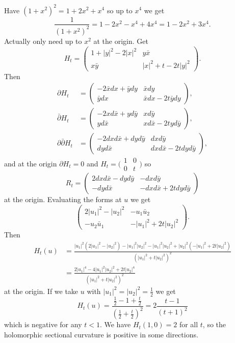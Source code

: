 \documentclass[10pt,a4paper]{amsart}
\def\p{\partial}
\def\bp{\bar\partial}
\def\hsc{holomorphic sectional curvature}
\begin{document}
Have $(1+x^2)^2 = 1 + 2x^2 + x^4$ so up to $x^4$ we get
$$
\frac{1}{(1+x^2)^2} = 1 - 2x^2 - x^4 + 4x^4 = 1 - 2x^2 + 3x^4.
$$
Actually only need up to $x^2$ at the origin.
Get
$$
H_t
=
\begin{pmatrix}
1 + |y|^2 - 2|x|^2 &
y \bar x
\\
x \bar y &
|x|^2 + t - 2t|y|^2
\end{pmatrix}.
$$
Then
\begin{align*}
\partial H_t
& =
\begin{pmatrix}
-2 \bar x dx + \bar y dy &
\bar x dy
\\
\bar y dx &
\bar x dx - 2t \bar y dy
\end{pmatrix},
\\
\bp H_t
& =
\begin{pmatrix}
-2 x d\bar x + y d\bar y &
x d\bar y
\\
y d\bar x &
x d\bar x - 2t y d\bar y
\end{pmatrix},
\\
\p \bp H_t
& =
\begin{pmatrix}
-2 dx d\bar x + dy d\bar y &
dx d\bar y
\\
dy d\bar x &
dx d\bar x - 2t dy d\bar y
\end{pmatrix},
\end{align*}
and at the origin $\p H_t = 0$ and
$H_t = \bigl( \begin{smallmatrix} 1 & 0 \\ 0 & t\end{smallmatrix}\bigr)$ so
$$
R_t =
\begin{pmatrix}
2 dx d\bar x - dy d\bar y &
-dx d\bar y
\\
-dy d\bar x &
-dx d\bar x + 2t dy d\bar y
\end{pmatrix}
$$
at the origin.
Evaluating the forms at $u$ we get
$$
\begin{pmatrix}
2 |u_1|^2 - |u_2|^2 &
-u_1 \bar u_2
\\
-u_2 \bar u_1 &
-|u_1|^2 + 2t |u_2|^2
\end{pmatrix}.
$$
Then
\begin{align*}
H_t(u)
&= \frac{
|u_1|^2(2|u_1|^2 - |u_2|^2)
- |u_1|^2 |u_2|^2
- |u_1|^2 |u_2|^2
+ |u_2|^2(-|u_1|^2 + 2t |u_2|^2)
}
{(|u_1|^2 + t |u_2|^2)^2}
\\
&= \frac{2 |u_1|^4 - 4 |u_1|^2 |u_2|^2 + 2t |u_2|^4}
{(|u_1|^2 + t |u_2|^2)^2}
\end{align*}
at the origin.
If we take $u$ with $|u_1|^2 = |u_2|^2 = \frac12$ we get
$$
H_t(u)
= \frac{\frac12 - 1 + \frac t2}{(\frac12 + \frac t2)^2}
= 2 \frac{t-1}{(t+1)^2}
$$
which is negative for any $t < 1$.
We have $H_t(1,0) = 2$ for all $t$, so the \hsc{} is positive in some directions.
\end{document}
